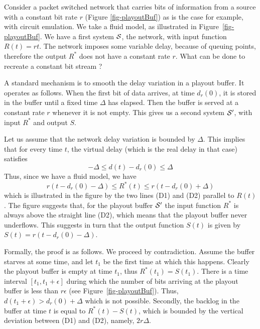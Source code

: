 Consider a packet switched network that carries bits of
information from a source with a constant bit rate $r$ (Figure
\ref{fig-playoutBuf}) as is the case for example, with circuit
emulation. We take a fluid model, as illustrated in
Figure~\ref{fig-playoutBuf}. We have a first system $\mathcal S$, the
network, with input function $R(t)=rt$. The network imposes some
variable delay, because of queuing points, therefore the output
$R^{*}$ does not have a constant rate $r$. What can be done to
recreate a constant bit stream ?
\begin{figure}[!htbp]
\end{figure}
A standard mechanism is to smooth the delay variation in a playout
buffer. It operates as follows. When the first bit of data
arrives, at time $d_r(0)$, %
it is stored in the buffer until a fixed time
$\Delta$ has elapsed. Then the buffer is served at a constant rate
$r$ whenever it is not empty. This gives us a second system
$\mathcal S'$, with input $R^*$ and output $S$.


Let us assume that the network delay variation is bounded by
$\Delta$. This implies that for every time $t$, the virtual delay
(which is the real delay in that case) satisfies
 $$ - \Delta \leq
d(t) - d_r(0) \leq \Delta $$
 Thus, since we have a fluid model, we
have
 $$r (t - d_r(0) - \Delta)  \leq R^*(t) \leq r (t - d_r(0) + \Delta)$$
 which is illustrated in the figure by the two lines (D1) and (D2)
parallel to $R(t)$.
 The figure suggests that,  for the playout
buffer $\mathcal S'$ the input function $R^*$ is always above the
straight line (D2), which means that the playout buffer never
underflows. This suggests in turn that the output function $S(t)$
is given by $S(t)=r( t - d_r(0) - \Delta)$.

Formally, the proof is as follows. We proceed by contradiction.
Assume the buffer starves at some time, and let $t_{1}$ be the
first time at which this happens. Clearly the playout buffer is
empty at time $t_{1}$, thus $R^*(t_1)=S(t_1)$. There is a time
interval $[t_{1}, t_{1}+ \epsilon]$ during which the number of
bits arriving at the playout buffer is less than $r \epsilon$ (see
Figure~\ref{fig-playoutBuf}). Thus, $d(t_{1}+ \epsilon) > d_r(0) +
\Delta$ which is not possible. Secondly, the backlog in the buffer
at time $t$ is equal to $R^*(t)-S(t)$, which is bounded by the
vertical deviation between (D1) and (D2), namely, $2r \Delta$.

